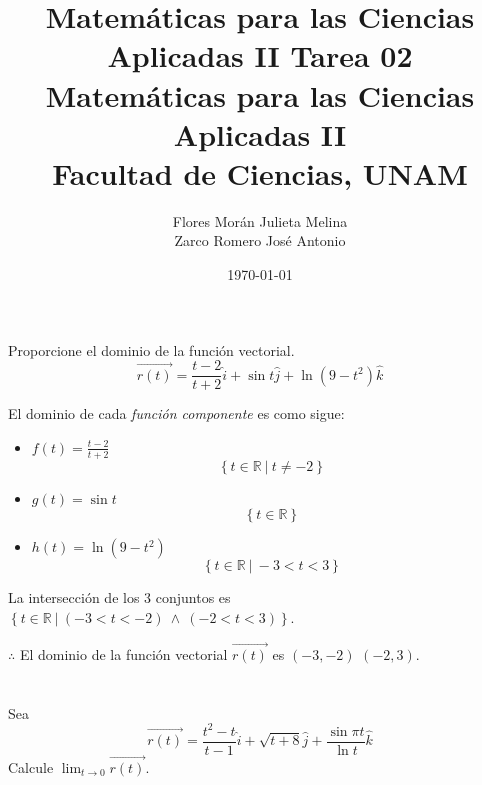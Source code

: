 \documentclass[12pt]{article}
\title{Matemáticas para las Ciencias Aplicadas II}
\title{
	\textbf{Tarea 02} \\
	\vspace{1ex}
	\large Matemáticas para las Ciencias Aplicadas II \\
	Facultad de Ciencias, UNAM}
\date{\today}
\author{Flores Morán Julieta Melina \\ Zarco Romero José Antonio}
\begin{document}
\maketitle

\section{}
Proporcione el dominio de la función vectorial.
\[
\vec{r(t)}
=
\frac{t-2}{t+2}\hat{i}
+
\sin{t}\hat{j}
+
\ln{(9-t^2)}\hat{k}
\]

El dominio de cada \textit{función componente} es como sigue:
\begin{itemize}[format=\textbf]

\item $f(t)=\frac{t-2}{t+2}$
  $$\left\{t \in \mathbb{R} ~|~ t \neq -2 \right\}$$

\item $g(t)=\sin{t}$
  $$\left\{t\in \mathbb{R} \right\}$$

\item $h(t)=\ln{(9-t^2)}$
  $$\left\{t\in \mathbb{R} ~|~ -3 < t < 3 \right\}$$

\end{itemize}
La intersección de los 3 conjuntos es $\left\{t\in \mathbb{R} ~|~ (-3<t<-2) ~ \land ~ (-2<t<3) \right\}$.

$\therefore$ El dominio de la función vectorial $\vec{r(t)}$ es $(-3,-2)$ \cup $(-2,3)$.


\section{}
Sea
\[
\vec{r(t)}
=
\frac{t^2-t}{t-1}\hat{i}
+
\sqrt{t+8}\hat{j}
+
\frac{\sin{\pi t}}{\ln{t}}\hat{k}
\]
Calcule $ \lim_{t \to 0} \vec{r(t)} $.
\end{document}
